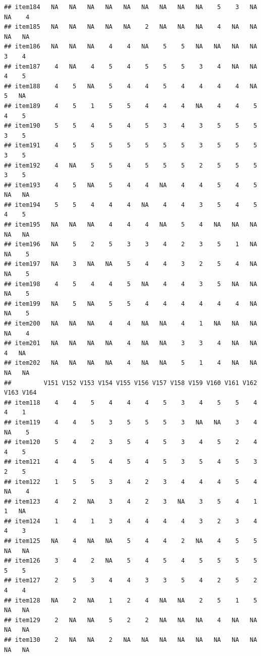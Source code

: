 \documentclass[
  man]{apa6}
\begin{document}
\begin{verbatim}
## item184   NA   NA   NA   NA   NA   NA   NA   NA   NA    5    3   NA   NA    4
## item185   NA   NA   NA   NA   NA    2   NA   NA   NA    4   NA   NA   NA   NA
## item186   NA   NA   NA    4    4   NA    5    5   NA   NA   NA   NA    3    4
## item187    4   NA    4    5    4    5    5    5    3    4   NA   NA    4    5
## item188    4    5   NA    5    4    4    5    4    4    4    4   NA    5   NA
## item189    4    5    1    5    5    4    4    4   NA    4    4    5    4    5
## item190    5    5    4    5    4    5    3    4    3    5    5    5    3    5
## item191    4    5    5    5    5    5    5    5    3    5    5    5    3    5
## item192    4   NA    5    5    4    5    5    5    2    5    5    5    3    5
## item193    4    5   NA    5    4    4   NA    4    4    5    4    5   NA   NA
## item194    5    5    4    4    4   NA    4    4    3    5    4    5    4    5
## item195   NA   NA   NA    4    4    4   NA    5    4   NA   NA   NA   NA   NA
## item196   NA    5    2    5    3    3    4    2    3    5    1   NA   NA    5
## item197   NA    3   NA   NA    5    4    4    3    2    5    4   NA   NA    5
## item198    4    5    4    4    5   NA    4    4    3    5   NA   NA   NA    5
## item199   NA    5   NA    5    5    4    4    4    4    4    4   NA   NA    5
## item200   NA   NA   NA    4    4   NA   NA    4    1   NA   NA   NA   NA    4
## item201   NA   NA   NA   NA    4   NA   NA    3    3    4   NA   NA    4   NA
## item202   NA   NA   NA   NA    4   NA   NA    5    1    4   NA   NA   NA   NA
##         V151 V152 V153 V154 V155 V156 V157 V158 V159 V160 V161 V162 V163 V164
## item118    4    4    5    4    4    4    5    3    4    5    5    4    4    1
## item119    4    4    5    3    5    5    5    3   NA   NA    3    4   NA    5
## item120    5    4    2    3    5    4    5    3    4    5    2    4    4    5
## item121    4    4    5    4    5    4    5    3    5    4    5    3    2    5
## item122    1    5    5    3    4    2    3    4    4    4    5    4   NA    4
## item123    4    2   NA    3    4    2    3   NA    3    5    4    1    1   NA
## item124    1    4    1    3    4    4    4    4    3    2    3    4    4    3
## item125   NA    4   NA   NA    5    4    4    2   NA    4    5    5   NA   NA
## item126    3    4    2   NA    5    4    5    4    5    5    5    5    5    5
## item127    2    5    3    4    4    3    3    5    4    2    5    2    4    4
## item128   NA    2   NA    1    2    4   NA   NA    2    5    1    5   NA   NA
## item129    2   NA   NA    5    2    2   NA   NA   NA    4   NA   NA   NA   NA
## item130    2   NA   NA    2   NA   NA   NA   NA   NA   NA   NA   NA   NA   NA

\end{verbatim}
\end{document}
